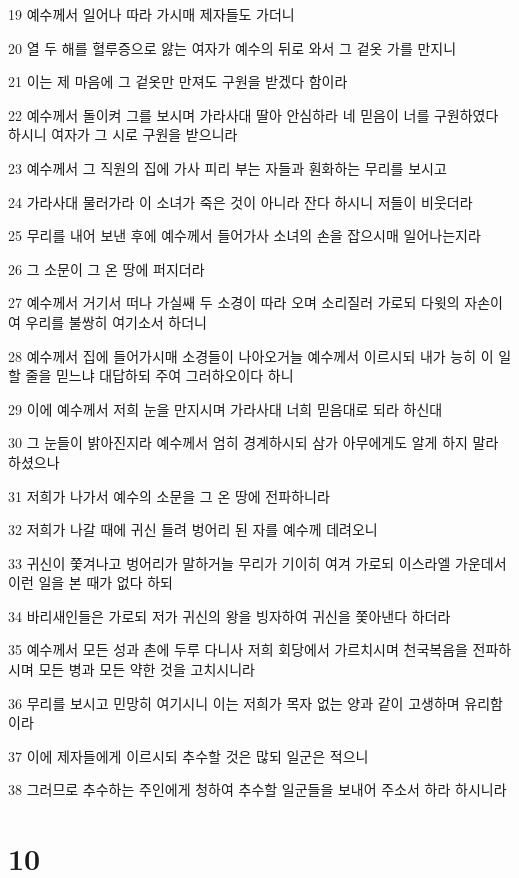 \par 19 예수께서 일어나 따라 가시매 제자들도 가더니
\par 20 열 두 해를 혈루증으로 앓는 여자가 예수의 뒤로 와서 그 겉옷 가를 만지니
\par 21 이는 제 마음에 그 겉옷만 만져도 구원을 받겠다 함이라
\par 22 예수께서 돌이켜 그를 보시며 가라사대 딸아 안심하라 네 믿음이 너를 구원하였다 하시니 여자가 그 시로 구원을 받으니라
\par 23 예수께서 그 직원의 집에 가사 피리 부는 자들과 훤화하는 무리를 보시고
\par 24 가라사대 물러가라 이 소녀가 죽은 것이 아니라 잔다 하시니 저들이 비웃더라
\par 25 무리를 내어 보낸 후에 예수께서 들어가사 소녀의 손을 잡으시매 일어나는지라
\par 26 그 소문이 그 온 땅에 퍼지더라
\par 27 예수께서 거기서 떠나 가실쌔 두 소경이 따라 오며 소리질러 가로되 다윗의 자손이여 우리를 불쌍히 여기소서 하더니
\par 28 예수께서 집에 들어가시매 소경들이 나아오거늘 예수께서 이르시되 내가 능히 이 일 할 줄을 믿느냐 대답하되 주여 그러하오이다 하니
\par 29 이에 예수께서 저희 눈을 만지시며 가라사대 너희 믿음대로 되라 하신대
\par 30 그 눈들이 밝아진지라 예수께서 엄히 경계하시되 삼가 아무에게도 알게 하지 말라 하셨으나
\par 31 저희가 나가서 예수의 소문을 그 온 땅에 전파하니라
\par 32 저희가 나갈 때에 귀신 들려 벙어리 된 자를 예수께 데려오니
\par 33 귀신이 쫓겨나고 벙어리가 말하거늘 무리가 기이히 여겨 가로되 이스라엘 가운데서 이런 일을 본 때가 없다 하되
\par 34 바리새인들은 가로되 저가 귀신의 왕을 빙자하여 귀신을 쫓아낸다 하더라
\par 35 예수께서 모든 성과 촌에 두루 다니사 저희 회당에서 가르치시며 천국복음을 전파하시며 모든 병과 모든 약한 것을 고치시니라
\par 36 무리를 보시고 민망히 여기시니 이는 저희가 목자 없는 양과 같이 고생하며 유리함이라
\par 37 이에 제자들에게 이르시되 추수할 것은 많되 일군은 적으니
\par 38 그러므로 추수하는 주인에게 청하여 추수할 일군들을 보내어 주소서 하라 하시니라

\chapter{10}

